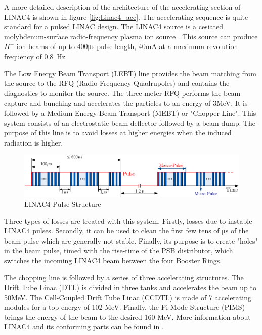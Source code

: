 A more detailed description of the architecture of the accelerating section of LINAC4 is shown in figure \ref{fig:Linac4_acc}. The accelerating sequence is quite standard for a pulsed LINAC design. The LINAC4 source is a cesiated molybdenum-surface radio-frequency plasma ion source \parencite*[][]{ref:SourceCite}. This source can produce $H^{-}$ ion beams of up to 400\si[]{\micro \second} pulse length, 40\si[]{\milli \ampere} at a maximum revolution frequency of \SI[]{0.8}{\hertz}

The Low Energy Beam Transport (LEBT) line provides the beam matching from the source to the RFQ (Radio Frequency Quadrupoles) and contains the diagnostics to monitor the source. The three meter RFQ performs the beam capture and bunching and accelerates the particles to an energy of 3\si[]{\mega \electronvolt}. It is followed by a Medium Energy Beam Transport (MEBT) or "Chopper Line". This system consists of an electrostatic beam deflector followed by a beam dump. The purpose of this line is to avoid losses at higher energies when the induced radiation is higher.

\begin{figure}[h]
    \centering
    \includegraphics[width=1.0\columnwidth]{Figure_Linac4PulseStructure/Linac4_PulseStruct.pdf}
    \caption{LINAC4 Pulse Structure }
    \label{fig:Linac4PulseStruct}
\end{figure}


Three types of losses are treated with this system. Firstly, losses due to instable LINAC4 pulses. Secondly, it can be used to clean the first few tens of \si[]{\micro \second} of the beam pulse which are generally not stable. Finally, its purpose is to create "holes" in the beam pulse, timed with the rise-time of the PSB distributor, which switches the incoming LINAC4 beam between the four Booster Rings.  

The chopping line is followed by a series of three accelerating structures. The Drift Tube Linac (DTL) is divided in three tanks and accelerates the beam up to 50\si[]{\mega \electronvolt}. The Cell-Coupled Drift Tube Linac (CCDTL) is made of 7 accelerating modules for a top energy of 102 \si[]{\mega \electronvolt}. Finally, the Pi-Mode Structure (PIMS) brings the energy of the beam to the desired 160 \si[]{\mega\electronvolt}. More information about LINAC4 and its conforming parts can be found in \parencite*[]{ref:Linac4Technical}.  

